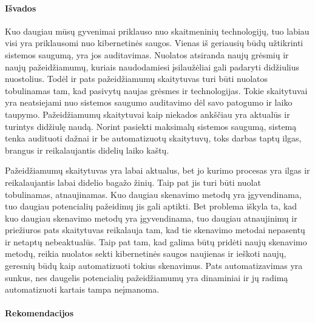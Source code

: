 \paragraph{Išvados}

Kuo daugiau mūsų gyvenimai priklauso nuo skaitmeninių technologijų, tuo labiau visi yra priklausomi nuo kibernetinės saugos. Vienas iš geriausių būdų užtikrinti sistemos saugumą, yra jos auditavimas. Nuolatos atsiranda naujų grėsmių ir naujų pažeidžiamumų, kuriais naudodamiesi įsilaužėliai gali padaryti didžiulius nuostolius. Todėl ir pats pažeidžiamumų skaitytuvas turi būti nuolatos tobulinamas tam, kad pasivytų naujas grėsmes ir technologijas. Tokie skaitytuvai yra neatsiejami nuo sistemos saugumo auditavimo dėl savo patogumo ir laiko taupymo. Pažeidžiamumų skaitytuvai kaip niekados ankščiau yra aktualūs ir turintys didžiulę naudą. Norint pasiekti maksimalų sistemos saugumą, sistemą tenka audituoti dažnai ir be automatizuotų skaitytuvų, toks darbas taptų ilgas, brangus ir reikalaujantis didelių laiko kaštų.

Pažeidžiamumų skaitytuvas yra labai aktualus, bet jo kurimo procesas yra ilgas ir reikalaujantis labai didelio bagažo žinių. Taip pat jis turi būti nuolat tobulinamas, atnaujinamas. Kuo daugiau skenavimo metodų yra įgyvendinama, tuo daugiau potencialių pažeidimų jis gali aptikti. Bet problema iškyla ta, kad kuo daugiau skenavimo metodų yra įgyvendinama, tuo daugiau atnaujinimų ir priežiuros pats skaitytuvas reikalauja tam, kad tie skenavimo metodai nepasentų ir netaptų nebeaktualūs. Taip pat tam, kad galima būtų pridėti naujų skenavimo metodų, reikia nuolatos sekti kibernetinės saugos naujienas ir ieškoti naujų, geresnių būdų kaip automatizuoti tokius skenavimus. Pats automatizavimas yra sunkus, nes daugelis potencialių pažeidžiamumų yra dinaminiai ir jų radimą automatizuoti kartais tampa neįmanoma. 

\paragraph{Rekomendacijos}

